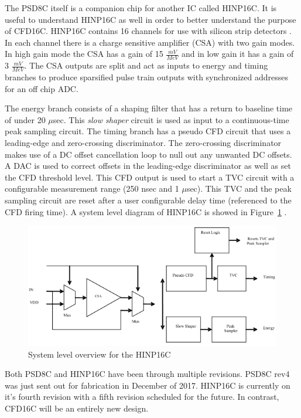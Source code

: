 \documentclass[12pt,oneside,final]{siuethesis}
\theoremstyle{definition}
\begin{document}
\par The PSD8C itself is a companion chip for another IC called HINP16C. It is useful to understand HINP16C as well in order to better understand the purpose of CFD16C. HINP16C contains 16 channels for use with silicon strip detectors \cite{HINP}. In each channel there is a charge sensitive amplifier (CSA) with two gain modes. In high gain mode the CSA has a gain of 15 $\frac{mV}{MeV}$ and in low gain it has a gain of 3 $\frac{mV}{MeV}$. The CSA outputs are split and act as inputs to energy and timing branches to produce sparsified pulse train outputs with synchronized addresses for an off chip ADC. 
\par The energy branch consists of a shaping filter that has a return to baseline time of under 20 $\mu$sec. This \emph{slow shaper} circuit is used as input to a continuous-time peak sampling circuit. The timing branch has a pseudo CFD circuit that uses a leading-edge and zero-crossing discriminator. The zero-crossing discriminator makes use of a DC offset cancellation loop to null out any unwanted DC offsets. A DAC is used to correct offsets in the leading-edge discriminator as well as set the CFD threshold level. This CFD output is used to start a TVC circuit with a configurable measurement range (250 nsec and 1 $\mu$sec). This TVC and the peak sampling circuit are reset after a user configurable delay time (referenced to the CFD firing time). A system level diagram of HINP16C is showed in Figure~\ref{fig:HINP} \cite{HINP-THESIS}.

\begin{figure}[ht]
\centering
\includegraphics[scale=1,keepaspectratio=true]{images/HINP_block.png} 
\caption{System level overview for the HINP16C}
\label{fig:HINP}
\end{figure}
\par Both PSD8C and HINP16C have been through multiple revisions. PSD8C rev4 was just sent out for fabrication in December of 2017. HINP16C is currently on it's fourth revision with a fifth revision scheduled for the future. In contrast, CFD16C will be an entirely new design.
\end{document}
